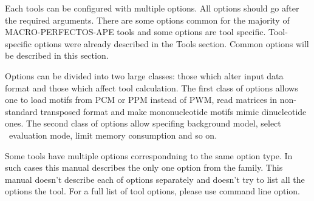 Each tools can be configured with multiple options. All options should go after the required arguments. There are some options common for the majority of MACRO-PERFECTOS-APE tools and some options are tool specific. Tool-specific options were already described in the Tools section. Common options will  be described in this section.

Options can be divided into two large classes: those which alter input data format and those which affect tool calculation. The first class of options allows one to load motifs from PCM or PPM instead of PWM, read matrices in non-standard transposed format and make mononucleotide motifs mimic dinucleotide ones. The second class of options allow specifing background model, select \pvalue\ evaluation mode, limit memory consumption and so on.

Some tools have multiple options correspondning to the same option type. In such cases this manual describes the only one option from the family. This manual doesn't describe each of options separately and doesn't try to list all the options the tool. For a full list of tool options, please use  command line option.
